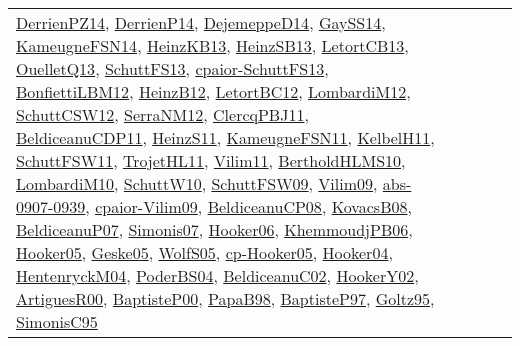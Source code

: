 {\begin{longtable}{lp{3cm}>{\raggedright}p{6cm}>{\raggedright}p{6cm}p{8cm}}
\href{papers/DerrienPZ14.pdf}{DerrienPZ14}\cite{DerrienPZ14}, \href{papers/DerrienP14.pdf}{DerrienP14}\cite{DerrienP14}, \href{papers/DejemeppeD14.pdf}{DejemeppeD14}\cite{DejemeppeD14}, \href{papers/GaySS14.pdf}{GaySS14}\cite{GaySS14}, \href{articles/KameugneFSN14.pdf}{KameugneFSN14}\cite{KameugneFSN14}, \href{papers/HeinzKB13.pdf}{HeinzKB13}\cite{HeinzKB13}, \href{articles/HeinzSB13.pdf}{HeinzSB13}\cite{HeinzSB13}, \href{papers/LetortCB13.pdf}{LetortCB13}\cite{LetortCB13}, \href{papers/OuelletQ13.pdf}{OuelletQ13}\cite{OuelletQ13}, \href{papers/SchuttFS13.pdf}{SchuttFS13}\cite{SchuttFS13}, \href{papers/cpaior-SchuttFS13.pdf}{cpaior-SchuttFS13}\cite{cpaior-SchuttFS13}, \href{papers/BonfiettiLBM12.pdf}{BonfiettiLBM12}\cite{BonfiettiLBM12}, \href{papers/HeinzB12.pdf}{HeinzB12}\cite{HeinzB12}, \href{papers/LetortBC12.pdf}{LetortBC12}\cite{LetortBC12}, \href{articles/LombardiM12.pdf}{LombardiM12}\cite{LombardiM12}, \href{papers/SchuttCSW12.pdf}{SchuttCSW12}\cite{SchuttCSW12}, \href{papers/SerraNM12.pdf}{SerraNM12}\cite{SerraNM12}, \href{papers/ClercqPBJ11.pdf}{ClercqPBJ11}\cite{ClercqPBJ11}, \href{articles/BeldiceanuCDP11.pdf}{BeldiceanuCDP11}\cite{BeldiceanuCDP11}, \href{papers/HeinzS11.pdf}{HeinzS11}\cite{HeinzS11}, \href{papers/KameugneFSN11.pdf}{KameugneFSN11}\cite{KameugneFSN11}, \href{articles/KelbelH11.pdf}{KelbelH11}\cite{KelbelH11}, \href{articles/SchuttFSW11.pdf}{SchuttFSW11}\cite{SchuttFSW11}, \href{articles/TrojetHL11.pdf}{TrojetHL11}\cite{TrojetHL11}, \href{papers/Vilim11.pdf}{Vilim11}\cite{Vilim11}, \href{papers/BertholdHLMS10.pdf}{BertholdHLMS10}\cite{BertholdHLMS10}, \href{papers/LombardiM10.pdf}{LombardiM10}\cite{LombardiM10}, \href{papers/SchuttW10.pdf}{SchuttW10}\cite{SchuttW10}, \href{papers/SchuttFSW09.pdf}{SchuttFSW09}\cite{SchuttFSW09}, \href{papers/Vilim09.pdf}{Vilim09}\cite{Vilim09}, \href{articles/abs-0907-0939.pdf}{abs-0907-0939}\cite{abs-0907-0939}, \href{papers/cpaior-Vilim09.pdf}{cpaior-Vilim09}\cite{cpaior-Vilim09}, \href{papers/BeldiceanuCP08.pdf}{BeldiceanuCP08}\cite{BeldiceanuCP08}, \href{articles/KovacsB08.pdf}{KovacsB08}\cite{KovacsB08}, \href{papers/BeldiceanuP07.pdf}{BeldiceanuP07}\cite{BeldiceanuP07}, \href{articles/Simonis07.pdf}{Simonis07}\cite{Simonis07}, \href{articles/Hooker06.pdf}{Hooker06}\cite{Hooker06}, \href{papers/KhemmoudjPB06.pdf}{KhemmoudjPB06}\cite{KhemmoudjPB06}, \href{articles/Hooker05.pdf}{Hooker05}\cite{Hooker05}, \href{papers/Geske05.pdf}{Geske05}\cite{Geske05}, \href{papers/WolfS05.pdf}{WolfS05}\cite{WolfS05}, \href{papers/cp-Hooker05.pdf}{cp-Hooker05}\cite{cp-Hooker05}, \href{papers/Hooker04.pdf}{Hooker04}\cite{Hooker04}, \href{papers/HentenryckM04.pdf}{HentenryckM04}\cite{HentenryckM04}, \href{articles/PoderBS04.pdf}{PoderBS04}\cite{PoderBS04}, \href{papers/BeldiceanuC02.pdf}{BeldiceanuC02}\cite{BeldiceanuC02}, \href{papers/HookerY02.pdf}{HookerY02}\cite{HookerY02}, \href{articles/ArtiguesR00.pdf}{ArtiguesR00}\cite{ArtiguesR00}, \href{articles/BaptisteP00.pdf}{BaptisteP00}\cite{BaptisteP00}, \href{articles/PapaB98.pdf}{PapaB98}\cite{PapaB98}, \href{papers/BaptisteP97.pdf}{BaptisteP97}\cite{BaptisteP97}, \href{papers/Goltz95.pdf}{Goltz95}\cite{Goltz95}, \href{papers/SimonisC95.pdf}{SimonisC95}\cite{SimonisC95} & 
\end{longtable}}
